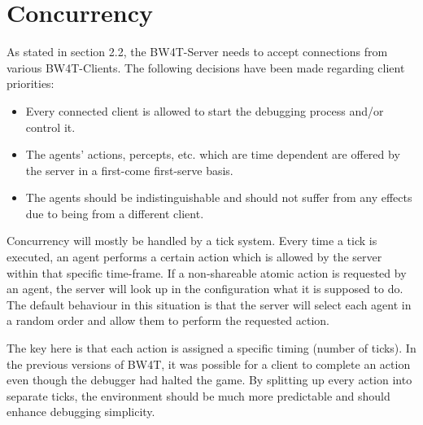 \section{Concurrency}
As stated in section 2.2, the BW4T-Server needs to accept connections from
various BW4T-Clients. The following decisions have been made regarding client
priorities:

\begin{itemize}
  \item Every connected client is allowed to start the debugging process and/or
    control it.
  \item The agents' actions, percepts, etc. which are time dependent are
    offered by the server in a first-come first-serve basis.
  \item The agents should be indistinguishable and should not suffer from any
    effects due to being from a different client.
\end{itemize}

Concurrency will mostly be handled by a tick system. Every time a tick is
executed, an agent performs a certain action which is allowed by the server
within that specific time-frame. If a non-shareable atomic action is requested
by an agent, the server will look up in the configuration what it is supposed
to do. The default behaviour in this situation is that the server will select each agent 
in a random order and allow them to perform the requested action.

The key here is that each action is assigned a specific timing (number of
ticks). In the previous versions of BW4T, it was possible for a
client to complete an action even though the debugger had halted the game. By
splitting up every action into separate ticks, the environment should be much more
predictable and should enhance debugging simplicity.
